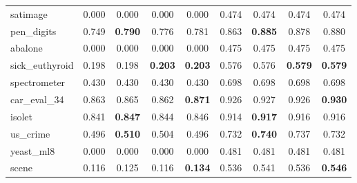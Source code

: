 \begin{figure}[ht]
\begin{tabular}{p{22mm}|*4{p{14mm}}|*4{p{14mm}}}
        satimage&\multicolumn{1}{c}{0.000}&\multicolumn{1}{c}{0.000}&\multicolumn{1}{c}{0.000}&\multicolumn{1}{c|}{0.000}&\multicolumn{1}{c}{0.474}&\multicolumn{1}{c}{0.474}&\multicolumn{1}{c}{0.474}&\multicolumn{1}{c}{0.474}\\
        pen\_digits&\multicolumn{1}{c}{0.749}&\multicolumn{1}{c}{\textbf{0.790}}&\multicolumn{1}{c}{0.776}&\multicolumn{1}{c|}{0.781}&\multicolumn{1}{c}{0.863}&\multicolumn{1}{c}{\textbf{0.885}}&\multicolumn{1}{c}{0.878}&\multicolumn{1}{c}{0.880}\\
        abalone&\multicolumn{1}{c}{0.000}&\multicolumn{1}{c}{0.000}&\multicolumn{1}{c}{0.000}&\multicolumn{1}{c|}{0.000}&\multicolumn{1}{c}{0.475}&\multicolumn{1}{c}{0.475}&\multicolumn{1}{c}{0.475}&\multicolumn{1}{c}{0.475}\\
        sick\_euthyroid&\multicolumn{1}{c}{0.198}&\multicolumn{1}{c}{0.198}&\multicolumn{1}{c}{\textbf{0.203}}&\multicolumn{1}{c|}{\textbf{0.203}}&\multicolumn{1}{c}{0.576}&\multicolumn{1}{c}{0.576}&\multicolumn{1}{c}{\textbf{0.579}}&\multicolumn{1}{c}{\textbf{0.579}}\\
        spectrometer&\multicolumn{1}{c}{0.430}&\multicolumn{1}{c}{0.430}&\multicolumn{1}{c}{0.430}&\multicolumn{1}{c|}{0.430}&\multicolumn{1}{c}{0.698}&\multicolumn{1}{c}{0.698}&\multicolumn{1}{c}{0.698}&\multicolumn{1}{c}{0.698}\\
        car\_eval\_34&\multicolumn{1}{c}{0.863}&\multicolumn{1}{c}{0.865}&\multicolumn{1}{c}{0.862}&\multicolumn{1}{c|}{\textbf{0.871}}&\multicolumn{1}{c}{0.926}&\multicolumn{1}{c}{0.927}&\multicolumn{1}{c}{0.926}&\multicolumn{1}{c}{\textbf{0.930}}\\
        isolet&\multicolumn{1}{c}{0.841}&\multicolumn{1}{c}{\textbf{0.847}}&\multicolumn{1}{c}{0.844}&\multicolumn{1}{c|}{0.846}&\multicolumn{1}{c}{0.914}&\multicolumn{1}{c}{\textbf{0.917}}&\multicolumn{1}{c}{0.916}&\multicolumn{1}{c}{0.916}\\
        us\_crime&\multicolumn{1}{c}{0.496}&\multicolumn{1}{c}{\textbf{0.510}}&\multicolumn{1}{c}{0.504}&\multicolumn{1}{c|}{0.496}&\multicolumn{1}{c}{0.732}&\multicolumn{1}{c}{\textbf{0.740}}&\multicolumn{1}{c}{0.737}&\multicolumn{1}{c}{0.732}\\
        yeast\_ml8&\multicolumn{1}{c}{0.000}&\multicolumn{1}{c}{0.000}&\multicolumn{1}{c}{0.000}&\multicolumn{1}{c|}{0.000}&\multicolumn{1}{c}{0.481}&\multicolumn{1}{c}{0.481}&\multicolumn{1}{c}{0.481}&\multicolumn{1}{c}{0.481}\\
        scene&\multicolumn{1}{c}{0.116}&\multicolumn{1}{c}{0.125}&\multicolumn{1}{c}{0.116}&\multicolumn{1}{c|}{\textbf{0.134}}&\multicolumn{1}{c}{0.536}&\multicolumn{1}{c}{0.541}&\multicolumn{1}{c}{0.536}&\multicolumn{1}{c}{\textbf{0.546}}\\

\end{tabular}
\end{figure}

